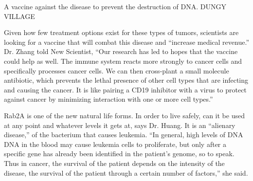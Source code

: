 \documentclass{article}
\begin{document}
A vaccine against the disease to prevent the destruction of DNA. DUNGY VILLAGE

Given how few treatment options exist for these types of tumors, scientists are looking for a vaccine that will combat this disease and “increase medical revenue.” Dr. Zhang told New Scientist, “Our research has led to hopes that the vaccine could help as well. The immune system reacts more strongly to cancer cells and specifically processes cancer cells. We can then cross-plant a small molecule antibiotic, which prevents the lethal presence of other cell types that are infecting and causing the cancer. It is like pairing a CD19 inhibitor with a virus to protect against cancer by minimizing interaction with one or more cell types.”

Rab2A is one of the new natural life forms. In order to live safely, can it be used at any point and whatever levels it gets at, says Dr. Huang. It is an “alienary disease,” of the bacterium that causes leukemia. “In general, high levels of DNA DNA in the blood may cause leukemia cells to proliferate, but only after a specific gene has already been identified in the patient’s genome, so to speak. Thus in cancer, the survival of the patient depends on the intensity of the disease, the survival of the patient through a certain number of factors,” she said.
\end{document}
